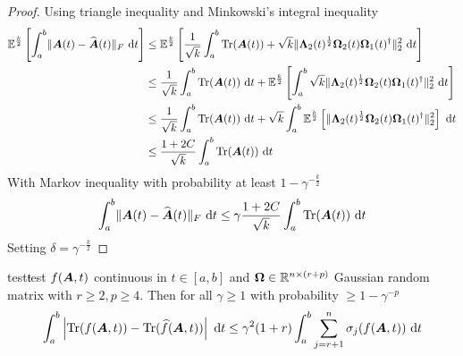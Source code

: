 \documentclass[12pt]{article}
\begin{document}
\begin{proof}
    Using triangle inequality and 
    Minkowski's integral inequality \cite[Theorem 2.2]{hardy-1952-inequalities}    
    \begin{align}
        \mathbb{E}^{\frac{k}{2}}\left[ \int_{a}^{b} \lVert \boldsymbol{A}(t) - \widehat{\boldsymbol{A}}(t) \rVert _F~\mathrm{d}t \right]
        &\leq \mathbb{E}^{\frac{k}{2}} \left[ \frac{1}{\sqrt{k}} \int_{a}^{b} \operatorname{Tr}(\boldsymbol{A}(t)) + \sqrt{k} \lVert \boldsymbol{\Lambda}_2(t)^{\frac{1}{2}} \boldsymbol{\Omega}_2(t) \boldsymbol{\Omega}_1(t)^{\dagger} \rVert _2^2~\mathrm{d}t  \right] \notag \\
        &\leq \frac{1}{\sqrt{k}} \int_{a}^{b} \operatorname{Tr}(\boldsymbol{A}(t))~\mathrm{d}t + \mathbb{E}^{\frac{k}{2}} \left[ \int_{a}^{b}  \sqrt{k} \lVert \boldsymbol{\Lambda}_2(t)^{\frac{1}{2}} \boldsymbol{\Omega}_2(t) \boldsymbol{\Omega}_1(t)^{\dagger} \rVert _2^2~\mathrm{d}t  \right] \notag \\
        &\leq \frac{1}{\sqrt{k}} \int_{a}^{b} \operatorname{Tr}(\boldsymbol{A}(t))~\mathrm{d}t + \sqrt{k} \int_{a}^{b} \mathbb{E}^{\frac{k}{2}} \left[ \lVert \boldsymbol{\Lambda}_2(t)^{\frac{1}{2}} \boldsymbol{\Omega}_2(t) \boldsymbol{\Omega}_1(t)^{\dagger} \rVert _2^2 \right]  ~\mathrm{d}t \notag \\
        &\leq \frac{1 + 2C}{\sqrt{k}} \int_{a}^{b} \operatorname{Tr}(\boldsymbol{A}(t))~\mathrm{d}t
    \end{align}
    With Markov inequality \cite{} with probability at least $1 - \gamma^{-\frac{k}{2}}$
    \begin{equation}
        \int_{a}^{b} \lVert \boldsymbol{A}(t) - \widehat{\boldsymbol{A}}(t) \rVert _F~\mathrm{d}t \leq \gamma \frac{1 + 2C}{\sqrt{k}} \int_{a}^{b} \operatorname{Tr}(\boldsymbol{A}(t))~\mathrm{d}t
    \end{equation}
    Setting $\delta = \gamma^{-\frac{k}{2}}$
\end{proof}

\begin{theorem}{test}{ŧest}
    $f(\boldsymbol{A}, t)$ continuous in $t \in [a, b]$ and $\boldsymbol{\Omega} \in \mathbb{R}^{n \times (r + p)}$ Gaussian random matrix with $r \geq 2, p \geq 4$. Then for all $\gamma \geq 1$ with probability $\geq 1 - \gamma^{-p}$
    \begin{equation}
        \int_{a}^{b} \left| \operatorname{Tr}(f(\boldsymbol{A}, t)) - \operatorname{Tr}(\widehat{f}(\boldsymbol{A}, t)) \right| ~\mathrm{d}t
        \leq \gamma^2 (1 + r) \int_{a}^{b} \sum_{j = r+1}^{n} \sigma_j(f(\boldsymbol{A}, t)) ~\mathrm{d}t
    \end{equation}
\end{theorem}
\end{document}
